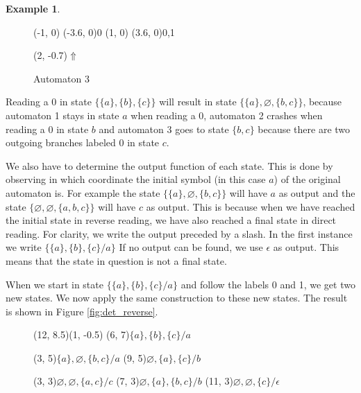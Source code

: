 \documentclass{article}
\theoremstyle{definition}
\newtheorem{example}[theorem]{Example}
\begin{document}
\begin{example}
\begin{itemize}
\begin{figure}[H]
\begin{graph}
  (-1, 0) \freetext(-3.6, 0){0}
   
   
  (1, 0) \freetext(3.6, 0){0,1}

  \freetext(2, -0.7){$\Uparrow$}
\end{graph}
\caption{Automaton 3}
\label{fig:nondet_reverse3}
\end{figure}

      Reading a 0 in state $\{\{a\}, \{b\}, \{c\}\}$ will result in state
      $\{\{a\}, \varnothing, \{b, c\}\}$, because automaton 1 stays in 
      state $a$ when reading a 0, automaton 2 crashes when reading a 0 in 
      state $b$ and automaton 3 goes to state $\{b, c\}$ because there are
      two outgoing branches labeled 0 in state $c$.

      We also have to determine the output function of each state. This is 
      done by observing in which coordinate the initial symbol (in this 
      case $a$) of the original automaton is.
      For example the state $\{\{a\}, \varnothing, \{b, c\}\}$ will have $a$
      as output and the state $\{\varnothing, \varnothing, \{a, b, c\}\}$ will
      have $c$ as output. This is because when we have reached the initial 
      state in reverse reading, we have also reached a final state in direct
      reading. For clarity, we write the output preceded by a slash. In the 
      first instance we write $\{\{a\}, \{b\}, \{c\} / a\}$ 
      If no output can be found, we use $\epsilon$ as output. This
      means that the state in question is not a final state.

      When we start in state $\{\{a\}, \{b\}, \{c\} / a\}$ and follow the
      labels 0 and 1, we get two new states. We now apply the same construction
      to these new states. The result is shown in Figure \ref{fig:det_reverse}.

\begin{figure}[H]
\begin{graph}(12, 8.5)(1, -0.5)
  (6, 7){$\{a\}, \{b\}, \{c\} / a$}

  (3, 5){$\{a\}, \varnothing, \{b, c\} / a$}
  (9, 5){$\varnothing, \{a\}, \{c\} / b$}

  (3, 3){$\varnothing, \varnothing, \{a, c\} / c$}
  (7, 3){$\varnothing, \{a\}, \{b, c\} / b$}
  (11, 3){$\varnothing, \varnothing, \{c\} / \epsilon$}


\end{graph}
\end{figure}
\end{itemize}
\end{example}
\end{document}
